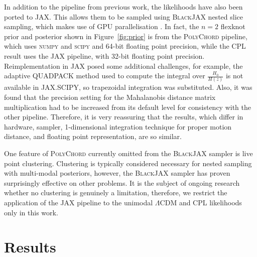\documentclass[fleqn,usenatbib]{mnras}
\newcommand{\lcdm}{$\Lambda$CDM}
\begin{document}
    In addition to the pipeline from previous work, the likelihoods have also been ported to \textsc{JAX}.
    This allows them to be sampled using \textsc{BlackJAX} nested slice sampling, which makes use of GPU parallelisation \citep{yallup2025nested, metha, cabezas2024blackjax}.
    In fact, the $n=2$ flexknot prior and posterior shown in Figure~\ref{fig:prior} is from the \textsc{PolyChord} pipeline, which uses \textsc{numpy} and \textsc{scipy} and 64-bit floating point precision, while the CPL result uses the \textsc{JAX} pipeline, with 32-bit floating point precision.
    Reimplementation in \textsc{JAX} posed some additional challenges, for example, the adaptive \textsc{QUADPACK} method used to compute the integral over $\frac{H_0}{H(z)}$ is not available in \textsc{JAX.SCIPY}, so trapezoidal integration was substituted.
    Also, it was found that the precision setting for the Mahalanobis distance matrix multiplication had to be increased from its default level for consistency with the other pipeline.
    Therefore, it is very reassuring that the results, which differ in hardware, sampler, 1-dimensional integration technique for proper motion distance, and floating point representation, are so similar.

    One feature of \textsc{PolyChord} currently omitted from the \textsc{BlackJAX} sampler is live point clustering.
    Clustering is typically considered necessary for nested sampling with multi-modal posteriors, however, the \textsc{BlackJAX} sampler has proven surprisingly effective on other problems.
    It is the subject of ongoing research whether no clustering is genuinely a limitation, therefore, we restrict the application of the \textsc{JAX} pipeline to the unimodal \lcdm{} and CPL likelihoods only in this work.

    \section{Results}\label{sec:results}
\end{document}
